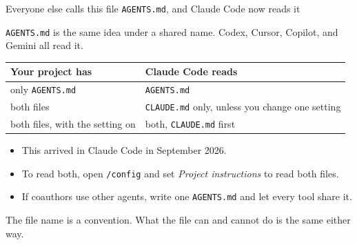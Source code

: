 \documentclass[aspectratio=169,11pt]{beamer}
\begin{document}
\begin{frame}{Everyone else calls this file \texttt{AGENTS.md}, and Claude Code now reads it}

\texttt{AGENTS.md} is the same idea under a shared name. Codex, Cursor, Copilot, and Gemini all read it.

\vspace{0.3cm}

\begin{center}
\footnotesize
\begin{tabular}{@{}ll@{}}
\toprule
\textbf{Your project has} & \textbf{Claude Code reads} \\
\midrule
only \texttt{AGENTS.md} & \texttt{AGENTS.md} \\
both files & \texttt{CLAUDE.md} only, unless you change one setting \\
both files, with the setting on & both, \texttt{CLAUDE.md} first \\
\bottomrule
\end{tabular}
\end{center}

\vspace{0.3cm}

\begin{itemize}\setlength\itemsep{0.3em}
    \item This arrived in Claude Code in September 2026.
    \item To read both, open \texttt{/config} and set \emph{Project instructions} to read both files.
    \item If coauthors use other agents, write one \texttt{AGENTS.md} and let every tool share it.
\end{itemize}

\vspace{0.2cm}

\alert{The file name is a convention. What the file can and cannot do is the same either way.}

\end{frame}
\end{document}
